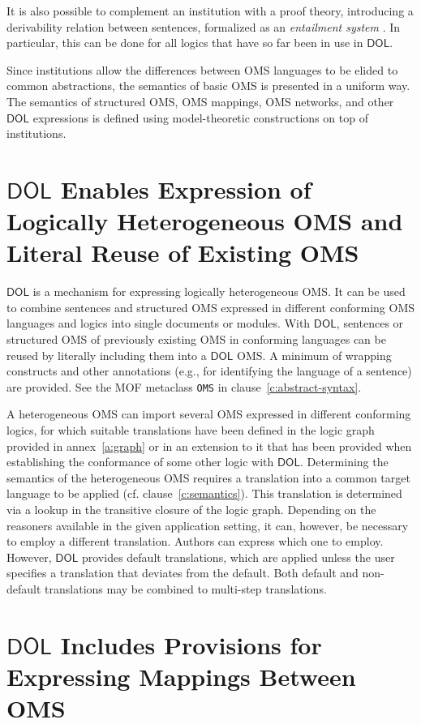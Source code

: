 \documentclass[10pt,fleqn,final]{scrreprt}
\makeatletter
\newcommand*{\cf}{cf.\@\xspace}
\newcommand*{\syntax}[1]{\texttt{#1}}
\newcommand*{\DOL}{\ensuremath{\mathsf{DOL}}\xspace}
\newcommand{\annexrefname}{annex}
\newcommand{\clauserefname}{clause}
\newcommand{\aref}[1]{\annexrefname~\ref{#1}}
\newcommand{\cref}[1]{\clauserefname~\ref{#1}}
\newenvironment{definitions}[0]{\medskip }{}
\makeatother
\begin{document}
\begin{definitions}
It is also possible to complement an institution with a proof theory,
introducing a derivability relation between sentences, formalized as 
an \emph{entailment system} \cite{Meseguer89}. In particular, this
can be done for all logics that have so far been in use in \DOL.


Since institutions allow the differences between OMS languages to be elided to common abstractions, 
the semantics of basic OMS is presented in a uniform way.  The semantics of structured OMS, 
OMS mappings, OMS networks, and other \DOL expressions is defined using model-theoretic constructions
on top of institutions. 


\section{\DOL Enables Expression of Logically Heterogeneous OMS and Literal Reuse of Existing OMS}
\DOL is a mechanism for expressing logically heterogeneous OMS. It can be used to combine sentences and structured OMS expressed in different conforming OMS languages
and logics into single documents or modules. With \DOL, sentences or structured OMS of previously existing OMS in
conforming languages can be reused by literally including them into a \DOL OMS. A minimum of wrapping constructs and other annotations (e.g., for identifying the language of a sentence) are provided. 
 See the
 MOF metaclass   \syntax{OMS} in
clause~\ref{c:abstract-syntax}.

A heterogeneous OMS can import several OMS expressed in different
conforming logics, for which suitable translations have been defined
in the logic graph provided in \aref{a:graph} or in an extension to it
that has been provided when establishing the conformance of some other
logic with \DOL.  Determining the semantics of the heterogeneous OMS
requires a translation into a common target language to be applied
(\cf \cref{c:semantics}).  This translation is determined via a lookup
in the transitive closure of the logic graph.  Depending on the
reasoners available in the given application setting, it can, however,
be necessary to employ a different translation.  Authors can express
which one to employ.   However, \DOL provides default translations, which are 
applied unless the user specifies a translation that deviates from the default. Both default and non-default translations may be combined to multi-step translations. 

\section{\DOL Includes Provisions for Expressing Mappings Between OMS}\label{c:req:links}


\end{definitions}
\end{document}
